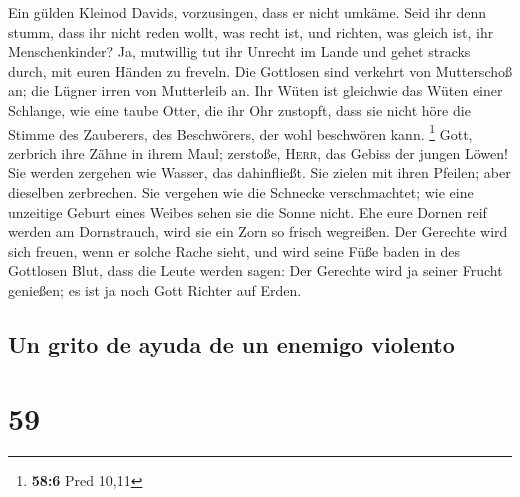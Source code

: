  Ein gülden Kleinod Davids, vorzusingen, dass er nicht
umkäme.  Seid ihr denn stumm, dass ihr nicht reden wollt,
was recht ist, und richten, was gleich ist, ihr Menschenkinder?
 Ja, mutwillig tut ihr Unrecht im Lande und gehet stracks
durch, mit euren Händen zu freveln.  Die Gottlosen sind
verkehrt von Mutterschoß an; die Lügner irren von Mutterleib an.
 Ihr Wüten ist gleichwie das Wüten einer Schlange, wie
eine taube Otter, die ihr Ohr zustopft,  dass sie nicht
höre die Stimme des Zauberers, des Beschwörers, der wohl beschwören
kann. \footnote{\textbf{58:6} Pred 10,11}  Gott, zerbrich
ihre Zähne in ihrem Maul; zerstoße, \textsc{Herr}, das Gebiss der jungen
Löwen!  Sie werden zergehen wie Wasser, das dahinfließt.
Sie zielen mit ihren Pfeilen; aber dieselben zerbrechen. 
Sie vergehen wie die Schnecke verschmachtet; wie eine unzeitige Geburt
eines Weibes sehen sie die Sonne nicht.  Ehe eure Dornen
reif werden am Dornstrauch, wird sie ein Zorn so frisch wegreißen.
 Der Gerechte wird sich freuen, wenn er solche Rache
sieht, und wird seine Füße baden in des Gottlosen Blut, 
dass die Leute werden sagen: Der Gerechte wird ja seiner Frucht
genießen; es ist ja noch Gott Richter auf Erden.

\hypertarget{un-grito-de-ayuda-de-un-enemigo-violento}{%
\subsection{Un grito de ayuda de un enemigo
violento}\label{un-grito-de-ayuda-de-un-enemigo-violento}}

\hypertarget{section-58}{%
\section{59}\label{section-58}}


